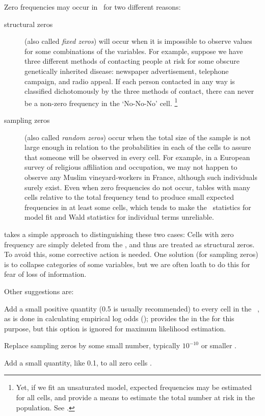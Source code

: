 Zero frequencies may occur in \ctabs\ for two different reasons:
\begin{description}
\item[structural zeros] (also called \emph{fixed zeros}) will occur when it is impossible to observe
values for some combinations of the variables.
For example, suppose we have three different methods of contacting
people at risk for some obscure genetically inherited disease:
newspaper advertisement, telephone campaign, and radio appeal.
If each person contacted in any way is classified dichotomously
by the three methods of contact, there can never be a non-zero
frequency in the `No-No-No' cell.%
\footnote{Yet, if we fit an unsaturated model, expected frequencies
may be estimated for all cells, and provide a means to estimate
the total number at risk in the population.
See \citet[Section 5.4]{Lindsey:95}.}
\item[sampling zeros] (also called \emph{random zeros})
occur when the total size of the sample is not large enough in relation to the probabilities in each of the cells to assure that someone will be observed
in every cell.
For example, in a European survey of religious affiliation and occupation,
we may not happen to observe any Muslim vineyard-workers in France, although such individuals surely exist.
Even when zero frequencies do not occur, tables with many cells relative to
the total frequency tend to produce small expected frequencies in at
least some cells, which tends to make  the \chisq\ statistics for model fit
and Wald statistics for individual terms unreliable.
\end{description}

 takes a simple approach to distinguishing these two cases:
Cells with zero frequency are simply deleted from the \ctab,
and thus are treated as structural zeros.  To avoid this, some corrective
action is needed.
One solution (for sampling zeros) is to collapse categories of some variables,
but we are often loath to do this for fear of loss of information.

Other suggestions are:
\begin{seriate}
\item Add a small positive quantity (0.5 is usually recommended) to every
cell in the \ctab\ \citep{Goodman:70}, as is done in calculating
empirical log odds ();
 provides the  in the  for this purpose,
but this option is ignored for maximum likelihood estimation.
\item Replace sampling zeros by some small number, typically
$10^{-10}$ or smaller \citep{Agresti:90}.
\item Add a small quantity, like 0.1, to all zero cells
\citep{EversNamboodiri:77}.
\end{seriate}



